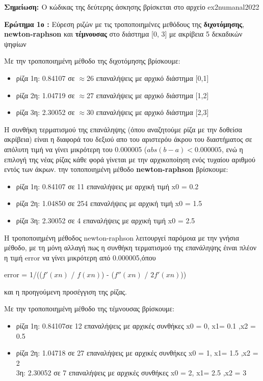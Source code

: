 \documentclass{article}
\begin{document}
\textbf{\large{Σημείωση: } } Ο κώδικας της δεύτερης άσκησης βρίσκεται στο αρχείο ex2numanal2022
\par\textbf{\large{Ερώτημα 1ο }:}
{Εύρεση ριζών με τις τροποποιημένες μεθόδους της \textbf{διχοτόμησης}, \textbf{newton-raphson} και \textbf{τέμνουσας} στο διάστημα [0, 3] με ακρίβεια 5 δεκαδικών ψηφίων}
\par Με την τροποποιημένη μέθοδο της διχοτόμησης βρίσκουμε:
\begin{itemize}
\item ρίζα 1η: 0.84107 σε $\approx$26 επαναλήψεις με αρχικό διάστημα [0,1]
\item ρίζα 2η: 1.04719 σε $\approx$27 επαναλήψεις με αρχικό διάστημα [1,2]
\item ρίζα 3η: 2.30052 σε $\approx$30 επαναλήψεις με αρχικό διάστημα [2,3]
\end{itemize}
 Η συνθήκη τερματισμού της επανάληψης (όπου αναζητούμε ρίζα με την δοθείσα ακρίβεια) είναι η διαφορά του δεξιού απο του αριστερόυ άκρου του διαστήματος σε απόλυτη τιμή να γίνει μικρότερη του 0.000005 ($abs(b-a)<0.000005$, ενώ η επιλογή της νέας ρίζας κάθε φορά γίνεται με την αρχικοποίηση ενός τυχαίου αριθμού εντός των άκρων.
 \newpage
{} την τοποποιημένη μέθοδο \textbf{newton-raphson} βρίσκουμε:
\begin{itemize}
\item ρίζα 1η: 0.84107 σε 11 επαναλήψεις με αρχική τιμή x0 = 0.2
\item ρίζα 2η: 1.04850 σε 254 επαναλήψεις με αρχική τιμή x0 = 1.5
\item ρίζα 3η: 2.30052 σε 4 επαναλήψεις με αρχική τιμή x0 = 2.5
\end{itemize}

Η τροποποιημένη μέθοδος newton-raphson λειτουργεί παρόμοια με την γνήσια μέθοδο, με τη μόνη αλλαγή πως η συνθήκη τερματισμού της επανάληψης έιναι πλέον η τιμή error να γίνει μικρότερη από 0.000005,όπου
\begin{center}error = 1/(($f'(xn)$ / $f(xn)$) - ($f''(xn)$ / $2f'(xn)$))\end{center}
και  η προηγούμενη προσέγγιση της ρίζας.

\par  Με την τροποποιημένη μέθοδο της τέμνουσας βρίσκουμε:
\begin{itemize}
    \item ρίζα 1η: 0.84107σε 12 επαναλήψεις με αρχικές συνθήκες x0 = 0, x1= 0.1  ,x2 = 0.5
    \item ρίζα 2η: 1.04718 σε 27 επαναλήψεις με αρχικές συνθήκες x0 = 1, x1= 1.5  ,x2 = 2\\
     3η: 2.30052 σε 7 επαναλήψεις με αρχικές συνθήκες x0 = 2, x1= 2.5  ,x2 = 3\\
\end{itemize}
\end{document}
